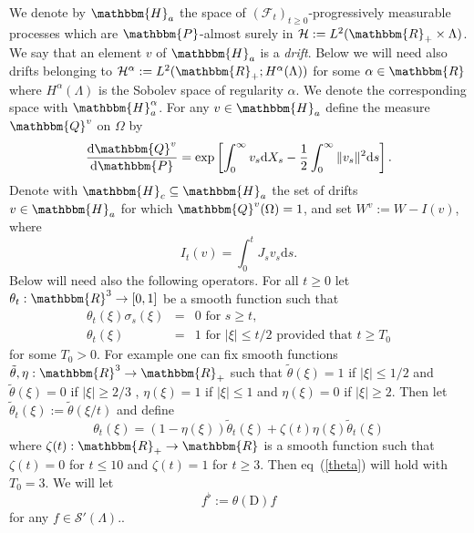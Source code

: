 \documentclass[11pt]{article}
\newcommand{\assign}{:=}
\newcommand{\mathD}{\mathrm{D}}
\newcommand{\mathd}{\mathrm{d}}
\newcommand{\tmtextit}[1]{{\itshape{#1}}}
\newcommand{\CF}{\mathscr{F}}
\newcommand{\CS}{\mathscr{S}}
\begin{document}
We denote by $\mathbbm{H}_a$ the space of $\left( \CF_t \right)_{t \geqslant
0}$-progressively measurable processes which are $\mathbbm{P}$-almost surely
in $\mathcal{H} \assign L^2 (\mathbbm{R}_+ \times \Lambda)$. We say that an
element $v$ of $\mathbbm{H}_a$ is a \tmtextit{drift}. Below we will need also
drifts belonging to $\mathcal{H}^{\alpha} \assign L^2 (\mathbbm{R}_+ ;
H^{\alpha} (\Lambda))$ for some $\alpha \in \mathbbm{R}$ where $H^{\alpha}
(\Lambda)$ is the Sobolev space of regularity $\alpha$. We denote the
corresponding space with $\mathbbm{H}_a^{\alpha}$. For any $v \in
\mathbbm{H}_a$ define the measure $\mathbbm{Q}^v$ on $\Omega$ by
\[ \frac{\mathd \mathbbm{Q}^v}{\mathd \mathbbm{P}} = \exp \left[
   \int_0^{\infty} v_s \mathd X_s - \frac{1}{2} \int_0^{\infty} \| v_s \|^2
   \mathd s \right] . \]
Denote with $\mathbbm{H}_c \subseteq \mathbbm{H}_a$ the set of drifts $v \in
\mathbbm{H}_a$ for which $\mathbbm{Q}^v (\Omega) = 1$, and set $W^v \assign W
- I (v)$, where
\[ I_t (v) = \int^t_0 J_s v_s \mathd s. \]
Below will need also the following operators. For all $t \geqslant 0$ let
$\theta_t : \mathbbm{R}^3 \rightarrow [0, 1]$ be a smooth function such that
\begin{equation}
  \begin{array}{lll}
    \theta_t (\xi) \sigma_s (\xi) & = & \text{$0$ for $s \geqslant t$,}\\
    \theta_t (\xi) & = & \text{$1$ for $| \xi | \leqslant t / 2$ \ provided
    that $t \geqslant T_0$}
  \end{array} \label{theta}
\end{equation}
for some $T_0 > 0$. For example one can fix smooth functions $\tilde{\theta},
\eta : \mathbbm{R}^3 \rightarrow \mathbbm{R}_+$ such that $\tilde{\theta}
(\xi) = 1$ if $| \xi | \leqslant 1 / 2$ and $\tilde{\theta} (\xi) = 0$ if $|
\xi | \geqslant 2 / 3$ , $\eta (\xi) = 1$ if $| \xi | \leqslant 1$ and $\eta
(\xi) = 0$ if $| \xi | \geqslant 2$. Then let $\tilde{\theta}_t (\xi) \assign
\tilde{\theta} (\xi / t)$ and define
\[ \theta_t (\xi) = (1 - \eta (\xi)) \tilde{\theta}_t (\xi) + \zeta (t) \eta
   (\xi) \tilde{\theta}_t (\xi) \]
where $\zeta (t) : \mathbbm{R}_+ \rightarrow \mathbbm{R}$ is a smooth function
such that $\zeta (t) = 0$ for $t \leqslant 10$ and $\zeta (t) = 1$ for $t
\geqslant 3$. Then eq~(\ref{theta}) will hold with $T_0 = 3$. We will let
\begin{equation}
  f^{\flat} \assign \theta (\mathD) f \label{eq:flat}
\end{equation}
for any $f \in \CS' (\Lambda)$..
\end{document}
